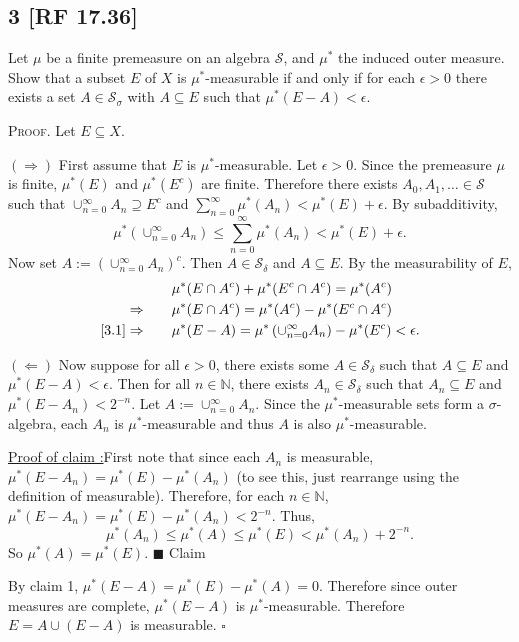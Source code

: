 \documentclass[12pt]{article}
\newcounter{ProofCounter}
\newcounter{ClaimCounter}[ProofCounter]
\newenvironment{Proof}{\stepcounter{ProofCounter}\textsc{Proof.}}{\hfill$\square$}
\newenvironment{claim}[1]{\vspace{1mm}\stepcounter{ClaimCounter}\par\noindent\underline{\bf Claim \theClaimCounter:}\space#1}{}
\newenvironment{claimproof}[1]{\par\noindent\underline{Proof of claim \theClaimCounter:}\space#1}{\hfill $\blacksquare$ Claim \theClaimCounter}
\begin{document}
\subsection*{3 [RF 17.36]}
\begin{tcolorbox}
Let $\mu$ be a finite premeasure on an algebra $\mathcal{S}$, and $\mu^{*}$ the induced outer measure. Show that a subset $E$ of $X$ is
$\mu^*$-measurable if and only if for each $\epsilon > 0$ there exists a set $A \in \mathcal{S}_{\sigma}$ with $A\subseteq E$ such that $\mu^*(E-A) <
\epsilon$.
\end{tcolorbox}
\begin{Proof} Let $E \subseteq X$.

$(\Rightarrow)$ First assume that $E$ is $\mu^*$-measurable. Let $\epsilon > 0$. Since the premeasure $\mu$ is finite, $\mu^*(E)$ and $\mu^*(E^{c})$ are finite. Therefore
there exists $A_{0}, A_1, \hdots \in \mathcal{S}$ such that $\cup_{n=0}^{\infty}A_{n} \supseteq E^{c}$ and $\sum_{n=0}^{\infty}\mu^*(A_{n}) <
\mu^{*}(E) + \epsilon$. By subadditivity,
\begin{equation}
\mu^{*}\left( \cup_{n=0}^{\infty}A_{n} \right) \leq \sum_{n=0}^{\infty}\mu^*(A_{n}) < \mu^*(E) + \epsilon.
\label{3.1}
\end{equation}
Now set $A := \left( \cup_{n=0}^{\infty}A_{n} \right)^{c}$. Then $A \in \mathcal{S}_{\delta}$ and $A\subseteq E$. By the measurability of $E$,
\begin{align*}
& \mu^{*}(E\cap A^{c}) + \mu^{*}(E^{c}\cap A^{c}) = \mu^{*}(A^{c}) \\
\Rightarrow \qquad & \mu^{*}(E\cap A^{c}) = \mu^{*}(A^{c}) - \mu^{*}(E^{c}\cap A^{c}) \\
\eqref{3.1} \Rightarrow \qquad & \mu^*(E - A) = \mu^*\left( \cup_{n=0}^{\infty}A_{n} \right) - \mu^{*}(E^{c}) < \epsilon.
\end{align*}

$(\Leftarrow)$ Now suppose for all $\epsilon > 0$, there exists some $A \in \mathcal{S}_{\delta}$ such that $A \subseteq E$ and $\mu^{*}(E - A) <
\epsilon$. Then for all $n \in \mathbb{N}$, there exists $A_{n} \in \mathcal{S}_{\delta}$ such that $A_{n} \subseteq E$ and $\mu^{*}(E - A_{n}) < 2^{-n}$.
Let $A := \cup_{n=0}^{\infty}A_{n}$. Since the $\mu^*$-measurable sets form a $\sigma$-algebra, each $A_{n}$ is $\mu^*$-measurable and thus $A$ is
also $\mu^*$-measurable.
\begin{claimproof}
First note that since each $A_{n}$ is measurable, $\mu^{*}(E - A_{n}) = \mu^*(E) - \mu^*(A_{n})$ (to see this, just rearrange using the definition of measurable).
Therefore, for each $n \in \mathbb{N}$, $\mu^{*}(E - A_{n}) = \mu^{*}(E) - \mu^{*}(A_{n}) < 2^{-n}$. Thus,
\[ \mu^{*}(A_{n}) \leq \mu^{*}(A) \leq \mu^{*}(E) < \mu^{*}(A_{n}) + 2^{-n}. \]
So $\mu^{*}(A) = \mu^{*}(E)$.
\end{claimproof}

By claim 1, $\mu^*(E - A) = \mu^*(E) - \mu^*(A) = 0$. Therefore since outer measures are complete, $\mu^*(E - A)$ is $\mu^{*}$-measurable. Therefore 
$E = A \cup (E - A)$ is measurable.
\end{Proof}
\end{document}
